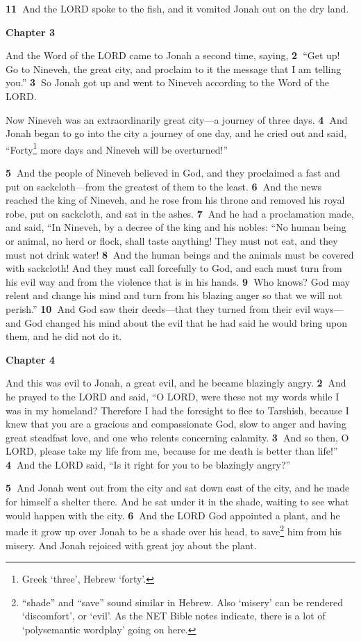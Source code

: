 \documentclass[
]{article}
\newcommand{\RL}[1]{\beginR #1\endR}
\begin{document}
\textbf{11~}And the LORD spoke to the fish, and it vomited Jonah out on
the dry land.

\textbf{Chapter 3~}

And the Word of the LORD came to Jonah a second time, saying,
\textbf{2~}\RL{``}Get up! Go to Nineveh, the great city, and proclaim to
it the message that I am telling you.'' \textbf{3~}So Jonah got up and
went to Nineveh according to the Word of the LORD.

Now Nineveh was an extraordinarily great city---a journey of three days.
\textbf{4~}And Jonah began to go into the city a journey of one day, and
he cried out and said, \RL{``}Forty\footnote{Greek `three', Hebrew
  `forty'.} more days and Nineveh will be overturned!''

\textbf{5~}And the people of Nineveh believed in God, and they
proclaimed a fast and put on sackcloth---from the greatest of them to
the least. \textbf{6~}And the news reached the king of Nineveh, and he
rose from his throne and removed his royal robe, put on sackcloth, and
sat in the ashes. \textbf{7~}And he had a proclamation made, and said,
\RL{``}In Nineveh, by a decree of the king and his nobles: \RL{``}No
human being or animal, no herd or flock, shall taste anything! They must
not eat, and they must not drink water! \textbf{8~}And the human beings
and the animals must be covered with sackcloth! And they must call
forcefully to God, and each must turn from his evil way and from the
violence that is in his hands. \textbf{9~}Who knows? God may relent and
change his mind and turn from his blazing anger so that we will not
perish.'' \textbf{10~}And God saw their deeds---that they turned from
their evil ways---and God changed his mind about the evil that he had
said he would bring upon them, and he did not do it.

\textbf{Chapter 4}

And this was evil to Jonah, a great evil, and he became blazingly angry.
\textbf{2~}And he prayed to the LORD and said, \RL{``}O LORD, were these
not my words while I was in my homeland? Therefore I had the foresight
to flee to Tarshish, because I knew that you are a gracious and
compassionate God, slow to anger and having great steadfast love, and
one who relents concerning calamity. \textbf{3~}And so then, O LORD,
please take my life from me, because for me death is better than life!''
\textbf{4~}And the LORD said, \RL{``}Is it right for you to be blazingly
angry?''

\textbf{5~}And Jonah went out from the city and sat down east of the
city, and he made for himself a shelter there. And he sat under it in
the shade, waiting to see what would happen with the city.
\textbf{6~}And the LORD God appointed a plant, and he made it grow up
over Jonah to be a shade over his head, to save\footnote{``shade'' and
  ``save'' sound similar in Hebrew. Also `misery' can be rendered
  `discomfort', or `evil'. As the NET Bible notes indicate, there is a
  lot of `polysemantic wordplay' going on here.} him from his misery.
And Jonah rejoiced with great joy about the plant.
\end{document}
